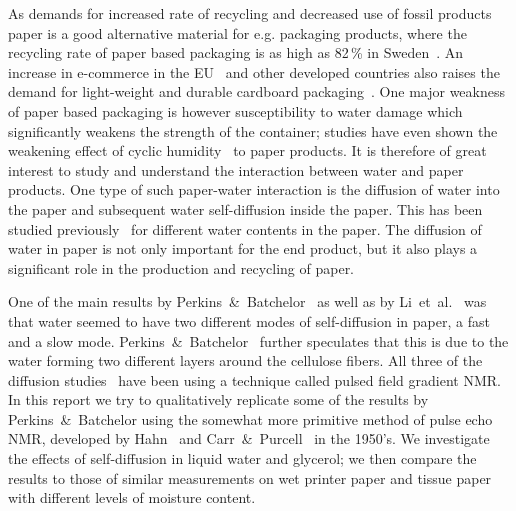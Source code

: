 \documentclass[11pt,a4paper, twocolumn,
swedish, english %
]{article}
\begin{document}
As demands for increased rate of recycling and decreased use of fossil
products paper is a good alternative material for e.g. packaging
products, where the recycling rate of paper based packaging is as high
as 82\,\% in Sweden~\cite{Adolfson_NVV2016}. An increase in e-commerce
in the EU~\cite{eurostat_e-commerce2017} and other developed countries
also raises the demand for light-weight and durable cardboard
packaging~\cite{Nordstrand2003}. One major weakness of paper based 
packaging is however susceptibility to water damage which
significantly weakens the strength of the container; studies have even
shown the weakening effect of cyclic
humidity~\cite{Sorensen-Hoffmann2004} to paper products. It is 
therefore of great interest to study and understand the interaction
between water and paper products. 
One type of such paper-water interaction is the diffusion of water
into the paper and subsequent water self-diffusion inside the 
paper. This has been studied previously~\cite{Perkins-Batchelor2012,
  Li-etal1992, Topgaard-Soderman2001} for different water contents in
the paper. The diffusion of water in paper is not only important for
the end product, but it also plays a significant role in the
production and recycling of paper.

One of the main results by
Perkins~\&~Batchelor~\cite{Perkins-Batchelor2012} as well as by
Li~et~al.~\cite{Li-etal1992} was that water 
seemed to have two different modes of self-diffusion in paper, a fast
and a slow mode. Perkins~\&~Batchelor~\cite{Perkins-Batchelor2012}
further speculates that this is due to the water forming two different
layers around the cellulose fibers. All three of the diffusion
studies~\cite{Perkins-Batchelor2012, Li-etal1992,
  Topgaard-Soderman2001} have been using a technique called pulsed 
field gradient NMR. In this report we try to qualitatively replicate
some of the results by Perkins~\&~Batchelor using the
somewhat more primitive method of pulse echo NMR, developed by
Hahn~\cite{Hahn1950} and Carr~\&~Purcell~\cite{Carr-Purcell1954} in
the 1950's. We investigate the effects of self-diffusion in liquid
water and glycerol; we then compare the results to those of similar
measurements on wet printer paper and tissue paper with different
levels of moisture content. 
\end{document}
